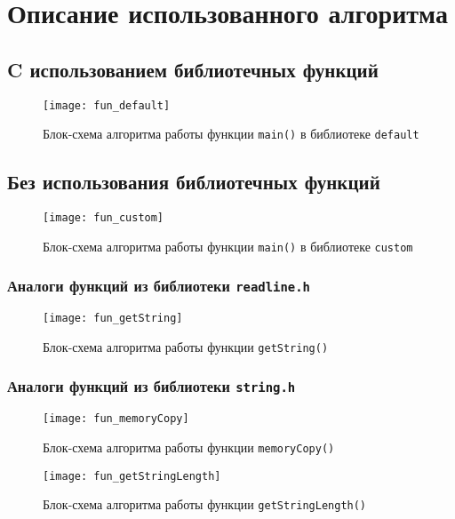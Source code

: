 \section{Описание использованного алгоритма}

\subsection{C использованием библиотечных функций}
\begin{figure}[H]
  \centering
  \texttt{[image: fun\_default]}
  \caption{Блок-схема алгоритма работы функции \texttt{main()} в библиотеке \texttt{default}}
\end{figure}

\subsection{Без использования библиотечных функций}
\begin{figure}[H]
  \centering
  \texttt{[image: fun\_custom]}
  \caption{Блок-схема алгоритма работы функции \texttt{main()} в библиотеке \texttt{custom}}
\end{figure}

\subsubsection{Аналоги функций из библиотеки \texttt{readline.h}}
\begin{figure}[H]
  \centering
  \texttt{[image: fun\_getString]}
  \caption{Блок-схема алгоритма работы функции \texttt{getString()}}
\end{figure}

\subsubsection{Аналоги функций из библиотеки \texttt{string.h}}
\begin{figure}[H]
  \centering
  \texttt{[image: fun\_memoryCopy]}
  \caption{Блок-схема алгоритма работы функции \texttt{memoryCopy()}}
\end{figure}
\begin{figure}[H]
  \centering
  \texttt{[image: fun\_getStringLength]}
  \caption{Блок-схема алгоритма работы функции \texttt{getStringLength()}}
\end{figure}


